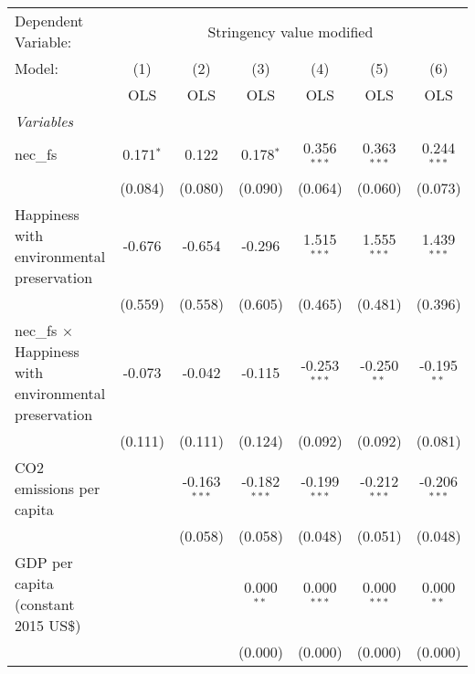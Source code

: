 
\begingroup
\centering
\begin{tabular}{lcccccc}
   \toprule
   Dependent Variable: & \multicolumn{6}{c}{Stringency value modified}\\
   Model:                                                       & (1)         & (2)            & (3)            & (4)            & (5)            & (6)\\  
                                                                &  OLS        & OLS            & OLS            & OLS            & OLS            & OLS\\  
   \midrule
   \emph{Variables}\\
   nec\_fs                                                      & 0.171$^{*}$ & 0.122          & 0.178$^{*}$    & 0.356$^{***}$  & 0.363$^{***}$  & 0.244$^{***}$\\   
                                                                & (0.084)     & (0.080)        & (0.090)        & (0.064)        & (0.060)        & (0.073)\\   
   Happiness with environmental preservation                    & -0.676      & -0.654         & -0.296         & 1.515$^{***}$  & 1.555$^{***}$  & 1.439$^{***}$\\   
                                                                & (0.559)     & (0.558)        & (0.605)        & (0.465)        & (0.481)        & (0.396)\\   
   nec\_fs $\times$ Happiness with environmental preservation   & -0.073      & -0.042         & -0.115         & -0.253$^{***}$ & -0.250$^{**}$  & -0.195$^{**}$\\   
                                                                & (0.111)     & (0.111)        & (0.124)        & (0.092)        & (0.092)        & (0.081)\\   
   CO2 emissions per capita                                     &             & -0.163$^{***}$ & -0.182$^{***}$ & -0.199$^{***}$ & -0.212$^{***}$ & -0.206$^{***}$\\   
                                                                &             & (0.058)        & (0.058)        & (0.048)        & (0.051)        & (0.048)\\   
   GDP per capita (constant 2015 US\$)                          &             &                & 0.000$^{**}$   & 0.000$^{***}$  & 0.000$^{***}$  & 0.000$^{**}$\\   
                                                                &             &                & (0.000)        & (0.000)        & (0.000)        & (0.000)\\   

\end{tabular}
